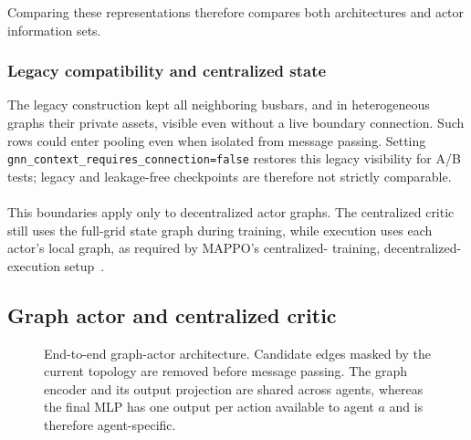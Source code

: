 Comparing these representations therefore compares both architectures and
actor information sets.

\subsubsection{Legacy compatibility and centralized state}

{\color{red}
The legacy construction kept all neighboring busbars, and in heterogeneous
graphs their private assets, visible even without a live boundary connection.
Such rows could enter pooling even when isolated from message passing.
Setting \texttt{gnn\_context\_requires\_connection=false} restores this legacy
visibility for A/B tests; legacy and leakage-free checkpoints are therefore
not strictly comparable.}
\\
\\
This boundaries apply only to decentralized actor graphs. The centralized
critic still uses the full-grid state graph during training, while
execution uses each actor's local graph, as required by MAPPO's centralized-
training, decentralized-execution setup~\cite{yu2022mappo}.

\subsection{Graph actor and centralized critic}
\label{subsec:graph-representation-encoder-boundary}

\begin{figure}[H]
  \color{black}
  \centering
  \resizebox{\textwidth}{!}{%
  }
  \caption{End-to-end graph-actor architecture. Candidate edges masked by the
  current topology are removed before message passing. The graph encoder and
  its output projection are shared across agents, whereas the final MLP has one
  output per action available to agent $a$ and is therefore agent-specific.}
  \label{fig:graph-actor-pipeline}
\end{figure}

